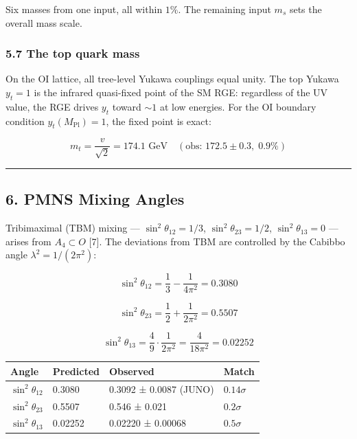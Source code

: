 \documentclass[
  11pt,
]{article}
\begin{document}
Six masses from one input, all within \(1\%\). The remaining input
\(m_s\) sets the overall mass scale.

\hypertarget{the-top-quark-mass}{%
\subsubsection{5.7 The top quark mass}\label{the-top-quark-mass}}

On the OI lattice, all tree-level Yukawa couplings equal unity. The top
Yukawa \(y_t = 1\) is the infrared quasi-fixed point of the SM RGE:
regardless of the UV value, the RGE drives \(y_t\) toward \(\sim 1\) at
low energies. For the OI boundary condition \(y_t(M_{\text{Pl}}) = 1\),
the fixed point is exact:

\[\boxed{m_t = \frac{v}{\sqrt{2}} = 174.1 \text{ GeV} \quad (\text{obs: } 172.5 \pm 0.3, \; 0.9\%)}\]

\begin{center}\rule{0.5\linewidth}{0.5pt}\end{center}

\hypertarget{pmns-mixing-angles}{%
\subsection{6. PMNS Mixing Angles}\label{pmns-mixing-angles}}

Tribimaximal (TBM) mixing --- \(\sin^2\theta_{12} = 1/3\),
\(\sin^2\theta_{23} = 1/2\), \(\sin^2\theta_{13} = 0\) --- arises from
\(A_4 \subset O\) {[}7{]}. The deviations from TBM are controlled by the
Cabibbo angle \(\lambda^2 = 1/(2\pi^2)\):

\[\sin^2\theta_{12} = \frac{1}{3} - \frac{1}{4\pi^2} = 0.3080\]

\[\sin^2\theta_{23} = \frac{1}{2} + \frac{1}{2\pi^2} = 0.5507\]

\[\sin^2\theta_{13} = \frac{4}{9} \cdot \frac{1}{2\pi^2} = \frac{4}{18\pi^2} = 0.02252\]

\begin{longtable}[]{@{}llll@{}}
\toprule\noalign{}
Angle & Predicted & Observed & Match \\
\midrule\noalign{}
\endhead
\bottomrule\noalign{}
\endlastfoot
\(\sin^2\theta_{12}\) & 0.3080 & 0.3092 ± 0.0087 (JUNO) &
\(0.14\sigma\) \\
\(\sin^2\theta_{23}\) & 0.5507 & 0.546 ± 0.021 & \(0.2\sigma\) \\
\(\sin^2\theta_{13}\) & 0.02252 & 0.02220 ± 0.00068 & \(0.5\sigma\) \\
\end{longtable}
\end{document}
